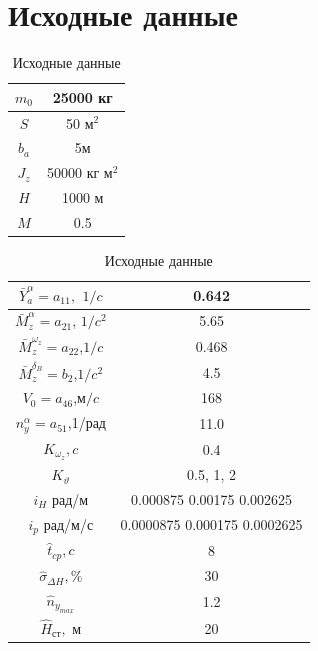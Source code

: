\documentclass[a4paper,12pt]{article}
\begin{document}
\section{Исходные данные}

    \begin{table}[H]
        \centering
        \caption{Исходные данные}
        \label{tab:Исходные данные 1}
        \begin{tabular}{|c|c|}
        \hline
            $m_0$ & 25000 кг  \\ \hline
            $S$ & 50 м$^2$ \\ \hline
            $b_a$ & 5м  \\ \hline
            $J_z$ & 50000 кг м$^2$ \\ \hline
            $H$ & 1000 м  \\ \hline
            $M$ & 0.5  \\ \hline
        \end{tabular}
    \end{table}
                                
    \begin{table}[H]
        \centering
        \caption{Исходные данные}
        \label{tab:Исходные данные 2}
        \begin{tabular}{|c|c|}
            \hline
            $\bar{Y}_a^\alpha=a_{11},$ $1/c$ &  0.642  \\ \hline
            $\bar{M}_z^{\alpha}=a_{21}$, $1/c^2$ &   5.65 \\ \hline
            $\bar{M}_z^{\omega_z}=a_{22}$,$1/c$ &  0.468 \\ \hline
            $\bar{M}^{\delta_B}_z=b_2$,$1/c^2$ & 4.5  \\ \hline
            $V_0=a_{46}$,м$/c$ & 168 \\ \hline
            $n_y^\alpha=a_{51}$,1/рад &  11.0  \\ \hline
            $K_{\omega_z}, c$ & 0.4 \\ \hline
            $K_\vartheta$  & 0.5, 1, 2  \\ \hline
            $i_H$ рад/м & 0.000875 0.00175 0.002625 \\ \hline
            $i_p$ рад/м/с & 0.0000875 0.000175 0.0002625 \\ \hline
            $\hat{t}_{cp},c$ & 8 \\ \hline
            $\hat{\sigma}_{\Delta H}, \%$ & 30 \\ \hline
            $\hat{n}_{y_{max}}$ & 1.2 \\ \hline
            $\hat{H}_{\text{ст}},$ м & 20 \\ \hline
            \end{tabular}
    \end{table}
\end{document}
